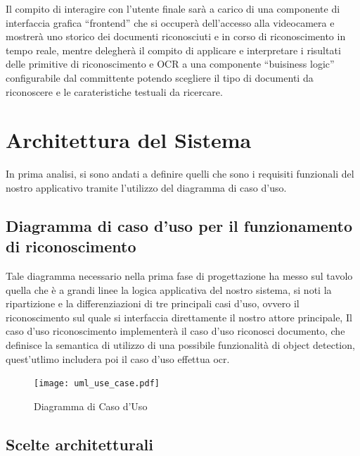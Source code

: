 \documentclass[12pt,a4paper]{article}
\begin{document}
Il compito di interagire con l'utente finale sarà a carico di una
componente di interfaccia grafica ``frontend'' che si occuperà
dell'accesso alla videocamera e mostrerà uno storico dei documenti
riconosciuti e in corso di riconoscimento in tempo reale, mentre
delegherà il compito di applicare e interpretare i risultati delle
primitive di riconoscimento e OCR a una componente ``buisiness logic''
configurabile dal committente potendo scegliere il tipo di documenti da
riconoscere e le carateristiche testuali da ricercare.

\section{Architettura del Sistema}

In prima analisi, si sono andati a definire quelli che sono i requisiti
funzionali del nostro applicativo tramite l'utilizzo del diagramma di
caso d'uso.

\subsection{Diagramma di caso d'uso per il funzionamento di
riconoscimento}

Tale diagramma necessario nella prima fase di progettazione ha messo sul
tavolo quella che è a grandi linee la logica applicativa del nostro
sistema, si noti la ripartizione e la differenziazioni di tre principali
casi d'uso, ovvero il riconoscimento sul quale si interfaccia
direttamente il nostro attore principale, Il caso d'uso riconoscimento
implementerà il caso d'uso riconosci documento, che definisce la semantica di
utilizzo di una possibile funzionalità di object detection, quest'utlimo
includera poi il caso d'uso effettua ocr.

\begin{figure}[H]
    \caption{Diagramma di Caso d'Uso}
    \centering
    \texttt{[image: uml\_use\_case.pdf]}
\end{figure}

\subsection{Scelte architetturali}
\end{document}
